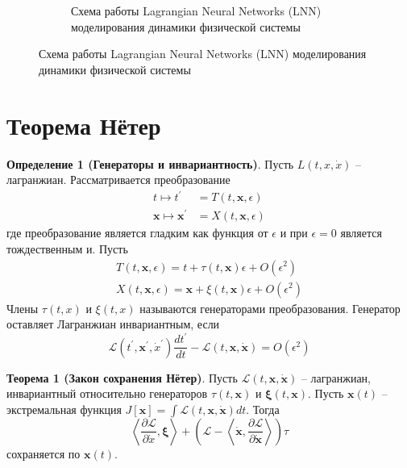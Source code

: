 \documentclass[12pt]{article}
\begin{document}
\begin{figure}[H]
\begin{subfigure}[b]{0.49\textwidth}
			\caption{Схема работы Lagrangian Neural Networks (LNN) моделирования динамики физической системы}
			\label{fig:three sin x}
		\end{subfigure}
	\end{figure}

	
	\section{Теорема Нётер}
	\textbf{Определение 1 (Генераторы и инвариантность)}. Пусть $L(t, x,\dot{x})$ -- лагранжиан. Рассматривается преобразование 
	\begin{equation}
	\begin{aligned}
	t \mapsto t^{\prime} &=T(t, \boldsymbol{x}, \epsilon) \\
	\boldsymbol{x} \mapsto \boldsymbol{x}^{\prime} &=X(t, \boldsymbol{x}, \epsilon)
	\end{aligned}
	\end{equation}
	где преобразование является гладким как функция от $\epsilon$ и при $\epsilon= 0$ является тождественным и. Пусть
	\begin{equation}
	\begin{array}{l}
	T(t, \boldsymbol{x}, \epsilon)=t+\tau(t, \boldsymbol{x}) \epsilon+O\left(\epsilon^{2}\right) \\
	X(t, \boldsymbol{x}, \epsilon)=\boldsymbol{x}+\xi(t, \boldsymbol{x}) \epsilon+O\left(\epsilon^{2}\right)
	\end{array}
	\end{equation}
	Члены $\tau (t, x)$ и $\xi (t, x)$ называются генераторами преобразования. Генератор оставляет Лагранжиан инвариантным, если
	\begin{equation}
	\mathcal{L}\left(t^{\prime}, \boldsymbol{x}^{\prime}, \dot{x}^{\prime}\right) \frac{d t^{\prime}}{d t}-\mathcal{L}(t, \boldsymbol{x}, \dot{\boldsymbol{x}})=O\left(\epsilon^{2}\right)
	\end{equation}
	
	\textbf{Теорема 1 (Закон сохранения Нётер)}.
	Пусть $\mathcal{L}(t, \boldsymbol{x}, \dot{\boldsymbol{x}})$ -- лагранжиан, инвариантный относительно генераторов $\tau(t, \boldsymbol{x})$ и $\boldsymbol{\xi}(t, \boldsymbol{x})$. Пусть $\boldsymbol{x}(t)$ -- экстремальная функция $J[\boldsymbol{x}]=\int \mathcal{L}(t, \boldsymbol{x}, \dot{\boldsymbol{x}}) d t$. Тогда
	$$
	\left\langle\frac{\partial \mathcal{L}}{\partial \dot{x}}, \boldsymbol{\xi}\right\rangle+\left(\mathcal{L}-\left\langle\dot{\boldsymbol{x}}, \frac{\partial \mathcal{L}}{\partial \dot{\boldsymbol{x}}}\right\rangle\right) \tau
	$$
	сохраняется по $\boldsymbol{x}(t)$.
	
\end{document}
